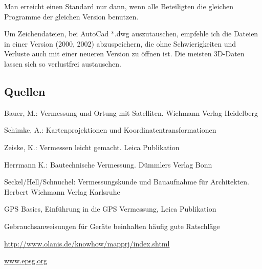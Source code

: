 Man erreicht einen Standard nur dann, wenn alle Beteiligten die gleichen Programme der gleichen Version benutzen.

Um Zeichendateien, bei AutoCad *.dwg auszutauschen, empfehle ich die Dateien in einer Version (2000, 2002) abzuspeichern, die ohne Schwierigkeiten und Verluste auch mit einer neueren Version zu öffnen ist. Die meisten 3D-Daten lassen sich so verlustfrei austauschen.

\subsection*{Quellen}
\begin{flushleft}
Bauer, M.: Vermessung und Ortung mit Satelliten. Wichmann Verlag Heidelberg

Schimke, A.: Kartenprojektionen und Koordinatentransformationen

Zeiske, K.: Vermessen leicht gemacht. Leica Publikation

Herrmann K.: Bautechnische Vermessung. Dümmlers Verlag Bonn

Seckel/Hell/Schnuchel: Vermessungskunde und Bauaufnahme für Architekten. Herbert Wichmann Verlag Karlsruhe

GPS Basics, Einführung in die GPS Vermessung, Leica Publikation

Gebrauchsanweisungen für Geräte beinhalten häufig gute Ratschläge

\url{http://www.olanis.de/knowhow/mapprj/index.shtml}

\url{www.epsg.org}
\end{flushleft}


